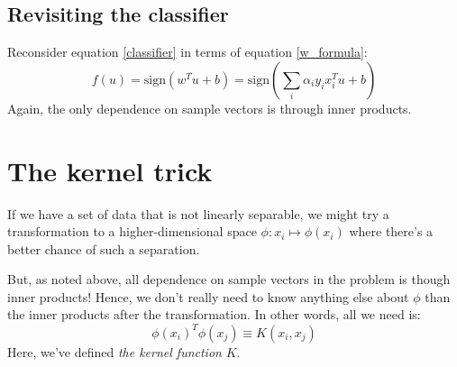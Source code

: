 \documentclass[12pt, a4paper]{article}
\numberwithin{equation}{section}
\begin{document}
\subsection{Revisiting the classifier}
Reconsider equation \ref{classifier} in terms of equation \ref{w_formula}:
\begin{equation}
f(u)=\textrm{sign}(w^T u+b)=\textrm{sign}\left(\sum_i\alpha_i y_i x_i^T u + b\right)
\end{equation}
Again, the only dependence on sample vectors is through inner products.

\section{The kernel trick}
If we have a set of data that is not linearly separable, we might try a transformation to a higher-dimensional space $\phi: x_i\mapsto\phi(x_i)$ where there's a better chance of such a separation. 

But, as noted above, all dependence on sample vectors in the problem is though inner products! Hence, we don't really need to know anything else about $\phi$ than the inner products after the transformation. In other words, all we need is:
\begin{equation}
\phi(x_i)^T\phi(x_j)\equiv K(x_i, x_j)
\end{equation}
Here, we've defined \textit{the kernel function} $K$.
\end{document}
